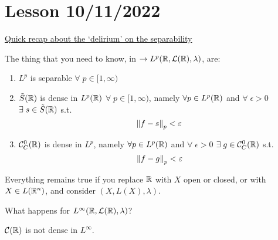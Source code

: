 \section{Lesson 10/11/2022}
\underline{Quick recap about the `delirium' on the separability}

The thing that you need to know, in \(\to L^p(\mathbb{R}, \mathcal{L}(\mathbb{R}), \lambda)\), are:
\begin{enumerate}
    \item \(L^p\) is separable \(\forall\; p \in [1, \infty)\)
    \item \(\tilde{S}(\mathbb{R})\) is dense in \(L^p(\mathbb{R})\) \(\forall \; p \in [1, \infty)\), 
    namely \(\forall p \in L^p (\mathbb{R})\) and \(\forall \; \epsilon >0 \) \(\exists \; s \in \tilde{S}(\mathbb{R})\) s.t. 
    \[
        \norm{f-s}_p < \varepsilon
    \]
    \item \(\mathcal{C}_C^0 (\mathbb{R})\) is dense in \(L^p\), namely \(\forall p \in L^p (\mathbb{R})\) and \(\forall \; \epsilon >0 \) \(\exists \; g \in \mathcal{C}_C^0(\mathbb{R})\) s.t. 
    \[
        \norm{f-g}_p < \varepsilon
    \]
\end{enumerate}
Everything remains true if you replace \(\mathbb{R}\) with \(X\) open or closed, or with \(X \in L(\mathbb{R}^n)\), and consider \((X, L(X), \lambda)\).

What happens for \(L^{\infty}(\mathbb{R}, \mathcal{L}(\mathbb{R}), \lambda)\)? 

\(\mathcal{C}(\mathbb{R})\) is not dense in \(L^\infty\).


